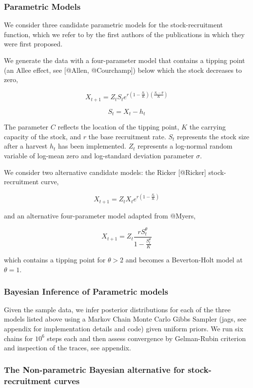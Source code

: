 \documentclass[author-year, review]{elsarticle} %
\begin{document}
\subsubsection{Parametric Models}

We consider three candidate parametric models for the stock-recruitment
function, which we refer to by the first authors of the publications in
which they were first proposed.

We generate the data with a four-parameter model that contains a tipping
point (an Allee effect, see {[}@Allen, @Courchamp{]}) below which the
stock decreases to zero,

\[ X_{t+1} = Z_t S_t e^{r \left(1 - \frac{S_t}{K}\right)\left(\frac{S_t - \theta}{K}\right)} \]

\[ S_t = X_t - h_t \]

The parameter $C$ reflects the location of the tipping point, $K$ the
carrying capacity of the stock, and $r$ the base recruitment rate. $S_t$
represents the stock size after a harvest $h_t$ has been implemented.
$Z_t$ represents a log-normal random variable of log-mean zero and
log-standard deviation parameter $\sigma$.

We consider two alternative candidate models: the Ricker {[}@Ricker{]}
stock-recruitment curve,

\[X_{t+1} = Z_t X_t e^{r \left(1 - \frac{S_t}{K} \right) } \]

and an alternative four-parameter model adapted from @Myers,

\[ X_{t+1} = Z_t \frac{r S_t^{\theta}}{1 - \frac{S_t^\theta}{K}} \]

which contains a tipping point for $\theta > 2$ and becomes a
Beverton-Holt model at $\theta = 1$.

\subsubsection{Bayesian Inference of Parametric models}

Given the sample data, we infer posterior distributions for each of the
three models listed above using a Markov Chain Monte Carlo Gibbs Sampler
(jags, see appendix for implementation details and code) given uniform
priors. We run six chains for $10^6$ steps each and then assess
convergence by Gelman-Rubin criterion and inspection of the traces, see
appendix.

\subsubsection{The Non-parametric Bayesian alternative for
stock-recruitment curves}
\end{document}
